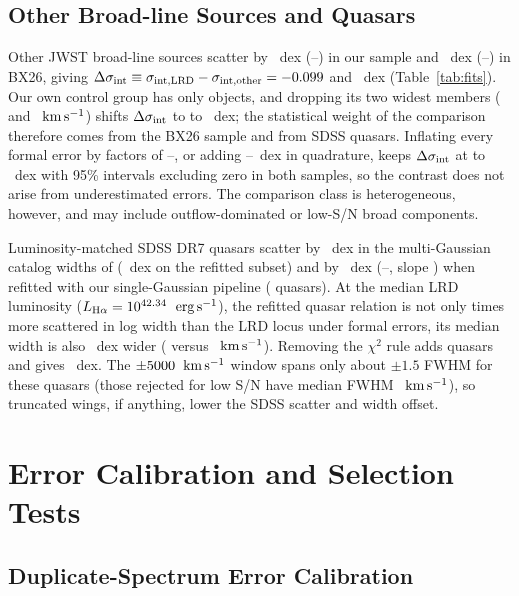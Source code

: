\documentclass[twocolumn,linenumbers]{aastex701}
\newcommand{\kms}{\ensuremath{{\rm km\,s^{-1}}}}
\newcommand{\ergs}{\ensuremath{{\rm erg\,s^{-1}}}}
\newcommand{\sigint}{\sigma_{\rm int}}
\newcommand{\LHa}{L_{\rm H\alpha}}
\newcommand{\BX}{BX26}
\begin{document}
\subsection{Other Broad-line Sources and Quasars} \label{sec:others}

Other JWST broad-line sources scatter by \Fsigo{}~dex (\Fsigolo{}--\Fsigohi{}) in our sample and \Xsigo{}~dex (\Xsigolo{}--\Xsigohi{}) in \BX{}, giving $\Delta\sigint\equiv\sigma_{\rm int,LRD}-\sigma_{\rm int,other}=\Fdsig{}$ and \Xdsig{}~dex (Table~\ref{tab:fits}).
Our own control group has only \NOther{} objects, and dropping its two widest members (\WOutA{} and \WOutB{}~\kms{}) shifts $\Delta\sigint$ to \FdsigDroplo{} to \FdsigDrophi{}~dex; the statistical weight of the comparison therefore comes from the \BX{} sample and from SDSS quasars.
Inflating every formal error by factors of \inflLo{}--\inflHi{}, or adding \inflFlrLo{}--\inflFlrHi{}~dex in quadrature, keeps $\Delta\sigint$ at \dsigInflLo{} to \dsigInflHi{}~dex with 95\% intervals excluding zero in both samples, so the contrast does not arise from underestimated errors.
The comparison class is heterogeneous, however, and may include outflow-dominated or low-S/N broad components.

Luminosity-matched SDSS DR7 quasars scatter by \Ssig{}~dex in the multi-Gaussian catalog widths of \citet{Shen2011} (\SsgCat{}~dex on the refitted subset) and by \Ssg{}~dex (\Ssglo{}--\Ssghi{}, slope \Ssgb{}) when refitted with our single-Gaussian pipeline (\NSsg{} quasars).
At the median LRD luminosity ($\LHa=10^{\LLRDmed{}}$~\ergs{}), the refitted quasar relation is not only \sdssRatSame{} times more scattered in log width than the LRD locus under formal errors, its median width is also \sdssWoff{}~dex wider (\WsdssMedL{} versus \WlrdMedL{}~\kms{}).
Removing the $\chi^2$ rule adds \NSsgChi{} quasars and gives \SsgNoChi{}~dex.
The $\pm5000{}$~\kms{} window spans only about $\pm1.5$ FWHM for these quasars (those rejected for low S/N have median FWHM \WSdssSNfail{}~\kms{}), so truncated wings, if anything, lower the SDSS scatter and width offset.



\section{Error Calibration and Selection Tests} \label{sec:tests}

\subsection{Duplicate-Spectrum Error Calibration} \label{sec:repeats}
\end{document}
